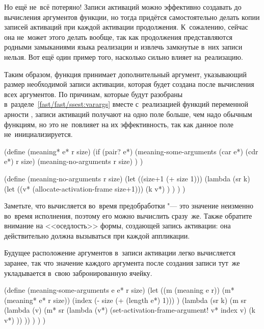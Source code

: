 Но ещё не~всё потеряно! Записи активаций можно эффективно создавать до
вычисления аргументов функции, но тогда  придётся самостоятельно
делать копии записей активаций при каждой активации продолжения. К~сожалению,
сейчас она не~может этого делать вообще, так как продолжения представляются
родными замыканиями языка реализации и извлечь замкнутые в~них записи нельзя.
Вот ещё один пример того, насколько сильно  влияет на~реализацию.

Таким образом, функция  принимает дополнительный аргумент,
указывающий размер необходимой записи активации, которая будет создана после
вычисления всех аргументов.  По причинам, которые
будут разобраны в~разделе~\ref{fast/fast/ssest:varargs} вместе с~реализацией
функций переменной арности , записи активаций
получают на одно поле больше, чем надо обычным функциям, но это не~повлияет на
их эффективность, так как данное поле не~инициализируется.

\begin{code:lisp}
(define (meaning* e* r size)
  (if (pair? e*)
      (meaning-some-arguments (car e*) (cdr e*) r size)
      (meaning-no-arguments r size) ) )

(define (meaning-no-arguments r size)
  (let ((size+1 (+ size 1)))
    (lambda (sr k)
      (let ((v* (allocate-activation-frame size+1)))
        (k v*) ) ) ) )
\end{code:lisp}

Заметьте, что  вычисляется во~время предобработки "--- это значение
неизменно во~время исполнения, поэтому его можно вычислить сразу~же. Также
обратите внимание на <<оседлость>> формы, создающей запись активации: она
действительно должна вызываться при каждой аппликации.

Будущее расположение аргументов в~записи активации легко вычисляется заранее,
так что значение каждого аргумента после создания записи тут~же укладывается
в~свою забронированную ячейку.

\begin{code:lisp}
(define (meaning-some-arguments e e* r size)
  (let ((m (meaning e r))
        (m* (meaning* e* r size))
        (index (- size (+ (length e*) 1))) )
    (lambda (sr k)
      (m sr (lambda (v)
              (m* sr (lambda (v*)
                       (set-activation-frame-argument! v* index v)
                       (k v*) )) )) ) ) )
\end{code:lisp}

